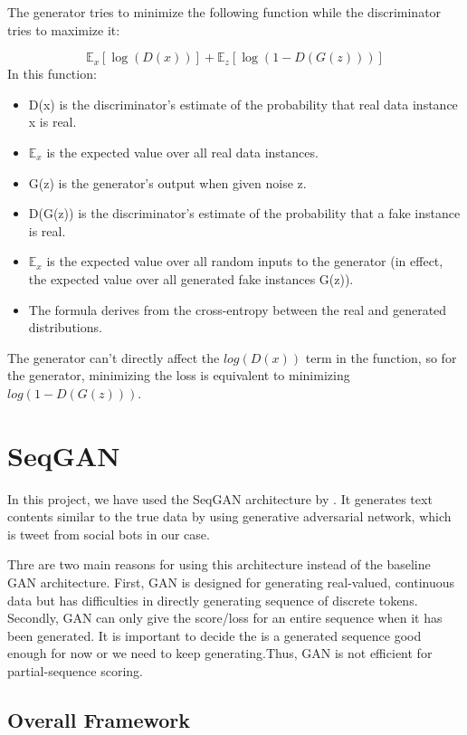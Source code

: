 \documentclass[conference]{IEEEtran}
\begin{document}
 The generator tries to minimize the following function while the discriminator tries to maximize it:

\begin{equation}
    \mathbb{E}_{x}[\log(D(x))] + \mathbb{E}_z[\log(1-D(G(z)))]
\end{equation}
    In this function:
\begin{itemize}
        \item D(x) is the discriminator's estimate of the probability that real data instance x is real.
        \item \( \mathbb{E}_x\) is the expected value over all real data instances.
         \item G(z) is the generator's output when given noise z.
        \item D(G(z)) is the discriminator's estimate of the probability that a fake instance is real.
        \item \( \mathbb{E}_x\) is the expected value over all random inputs to the generator (in effect, the expected value over all generated fake instances G(z)).
        \item The formula derives from the cross-entropy between the real and generated distributions.
\end{itemize}
The generator can't directly affect the $ log(D(x)) $ term in the function, so for the generator, minimizing the loss is equivalent to minimizing $ log(1 - D(G(z))) $.        
        
\section{SeqGAN}

In this project, we have used the SeqGAN architecture by \citeauthor{yu2016seqgan} \cite{yu2016seqgan}. It generates text contents similar to the true data by using generative adversarial network, which is tweet from social bots in our case. 

Thre are two main reasons for using this architecture instead of the baseline GAN architecture. First, GAN is designed for generating real-valued, continuous data but has difficulties in directly generating sequence of discrete tokens. Secondly, GAN can only give the score/loss for an entire sequence when it has been generated. It is important to decide the is a generated sequence good enough for now or we need to keep generating.Thus, GAN is not efficient for partial-sequence scoring. 

\subsection{Overall Framework}
\end{document}
